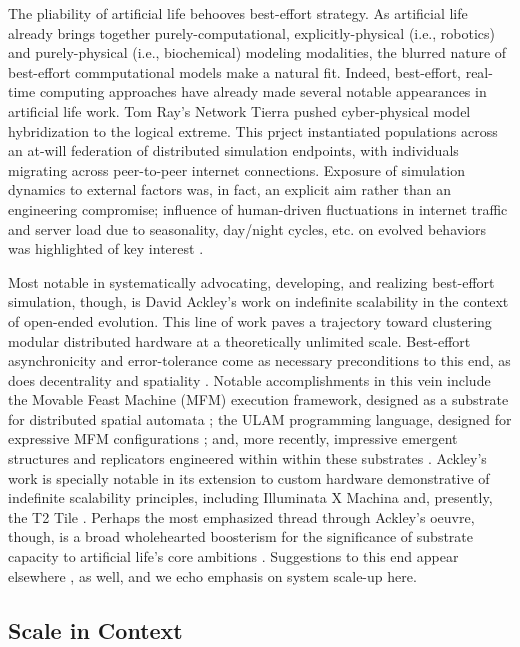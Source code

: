 The pliability of artificial life behooves best-effort strategy.
As artificial life already brings together purely-computational, explicitly-physical (i.e., robotics) and purely-physical (i.e., biochemical) modeling modalities, the blurred nature of best-effort commputational models make a natural fit.
Indeed, best-effort, real-time computing approaches have already made several notable appearances in artificial life work.
Tom Ray's Network Tierra pushed cyber-physical model hybridization to the logical extreme.
This prject instantiated populations across an at-will federation of distributed simulation endpoints, with individuals migrating across peer-to-peer internet connections.
Exposure of simulation dynamics to external factors was, in fact, an explicit aim rather than an engineering compromise;
influence of human-driven fluctuations in internet traffic and server load due to seasonality, day/night cycles, etc. on evolved behaviors was highlighted of key interest \citep{ray1995proposal}.

Most notable in systematically advocating, developing, and realizing best-effort simulation, though, is David Ackley's work on indefinite scalability in the context of open-ended evolution.
This line of work paves a trajectory toward clustering modular distributed hardware at a theoretically unlimited scale.
Best-effort asynchronicity and error-tolerance come as necessary preconditions to this end, as does decentrality and spatiality \citep{ackley2011pursue}.
Notable accomplishments in this vein include the Movable Feast Machine (MFM) execution framework, designed as a substrate for distributed spatial automata \citep{ackley2013movable}; the ULAM programming language, designed for expressive MFM configurations \citep{ackley2016ulam}; and, more recently, impressive emergent structures and replicators engineered within within these substrates \citep{ackley2018digital,ackley2023robust}.
Ackley's work is specially notable in its extension to custom hardware demonstrative of indefinite scalability principles, including Illuminata X Machina \citep{ackley2011homeostatic} and, presently, the T2 Tile \citep{ackley2023robust}.
Perhaps the most emphasized thread through Ackley's oeuvre, though, is a broad wholehearted boosterism for the significance of substrate capacity to artificial life's core ambitions \citep{ackley2014indefinitely}.
Suggestions to this end appear elsewhere \citep{channon2019maximum,banzhaf2016defining,moreno2019toward}, as well, and we echo emphasis on system scale-up here.

\subsection{Scale in Context}


